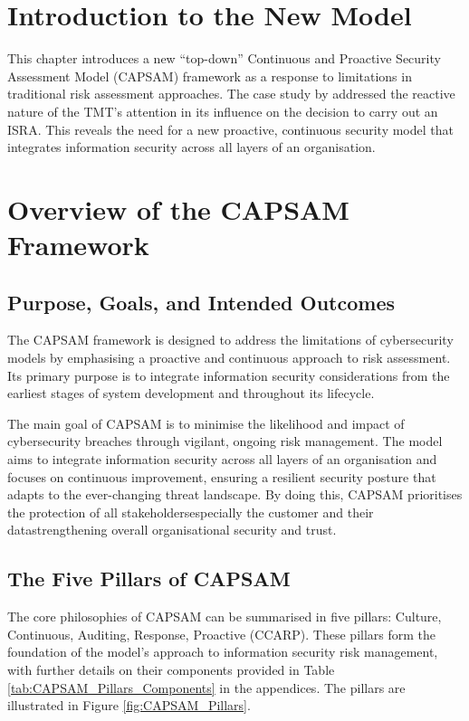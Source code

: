 \section{Introduction to the New Model}
This chapter introduces a new ``top-down'' Continuous and Proactive Security Assessment Model (CAPSAM) framework as a response to limitations in traditional risk assessment approaches. The case study by \citet{shaikh2023information} addressed the reactive nature of the TMT's attention in its influence on the decision to carry out an ISRA. This reveals the need for a new proactive, continuous security model that integrates information security across all layers of an organisation.

\section{Overview of the CAPSAM Framework}
    \subsection{Purpose, Goals, and Intended Outcomes}
    The CAPSAM framework is designed to address the limitations of cybersecurity models by emphasising a proactive and continuous approach to risk assessment. Its primary purpose is to integrate information security considerations from the earliest stages of system development and throughout its lifecycle.

    The main goal of CAPSAM is to minimise the likelihood and impact of cybersecurity breaches through vigilant, ongoing risk management. The model aims to integrate information security across all layers of an organisation and focuses on continuous improvement, ensuring a resilient security posture that adapts to the ever-changing threat landscape. By doing this, CAPSAM prioritises the protection of all stakeholders\textemdash especially the customer and their data\textemdash strengthening overall organisational security and trust.

    \subsection{The Five Pillars of CAPSAM}
    The core philosophies of CAPSAM can be summarised in five pillars: Culture, Continuous, Auditing, Response, Proactive (CCARP). These pillars form the foundation of the model's approach to information security risk management, with further details on their components provided in Table \ref{tab:CAPSAM_Pillars_Components} in the appendices. The pillars are illustrated in Figure \ref{fig:CAPSAM_Pillars}.

